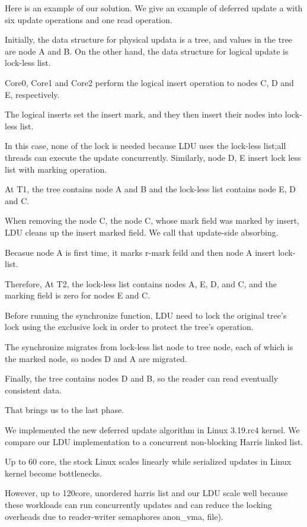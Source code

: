 Here is an example of our solution.
We give an example of deferred update a with six update operations and
one read operation.

Initially, the data structure for physical updata is a tree, and values
in the tree are node A and B.
On the other hand, the data structure for logical update is lock-less list.

Core0, Core1 and Core2 perform the
logical insert operation to nodes C, D and E, respectively.

The logical inserts set the insert mark, and they then insert their
nodes into lock-less list.

In this case, none of the lock is needed because LDU uses the lock-less
list;all threads can execute the update concurrently.
Similarly, node D, E insert lock less list with marking operation.

At T1, the tree contains node A and B and the lock-less list contains node
E, D and C.

When removing the node C, the node C, whose mark field was marked
by insert, LDU cleans up the insert marked field.
We call that update-side absorbing.

Becasue node A is first time, it marks r-mark feild and
then node A insert lock-list.

Therefore, At T2, the lock-less list contains nodes A, E, D, and C, and the
marking field is zero for nodes E and C.

Before running the synchronize function, LDU need to lock the original tree's
lock using the exclusive lock in order to protect the tree's operation.

The synchronize migrates from lock-less list node to tree node, each of 
which is the marked node, so nodes D and A are migrated.

Finally, the tree contains nodes D and B, so the reader can read eventually
consistent data.

That brings us to the last phase.

We implemented the new deferred update algorithm in Linux 3.19.rc4 kernel.
We compare our LDU implementation to a concurrent non-blocking Harris linked
list.

Up to 60 core, the stock Linux scales linearly while serialized updates in
Linux kernel become bottlenecks.
 
However, up to 120core, unordered harris list and our LDU scale well because
these workloads can run concurrently updates and can reduce the locking
overheads due to reader-writer semaphores anon_vma, file).

